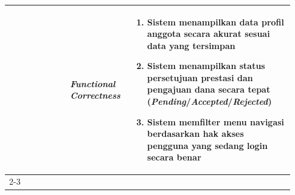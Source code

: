 \begin{longtable}{|p{0.2\linewidth}|p{0.2\linewidth}|p{0.53\linewidth}|}
                                                                  & \textbf{\textit{Functional Correctness}}                                                                                                                & \begin{enumerate}[before=\vspace{-8pt}, leftmargin=*, nosep, series=FSCR] \item Sistem menampilkan data profil anggota secara akurat sesuai data yang tersimpan \item Sistem menampilkan status persetujuan prestasi dan pengajuan dana secara tepat (\textit{Pending}/\textit{Accepted}/\textit{Rejected}) \item Sistem memfilter menu navigasi berdasarkan hak akses pengguna yang sedang login secara benar \end{enumerate}                                                                                                                                                                                                                                                                                                                                                                                                                                                                                                                                                                                                                                                                                                                                                                                                                                                                                                                                                                                               \\
      \cline{2-3}


\end{longtable}
